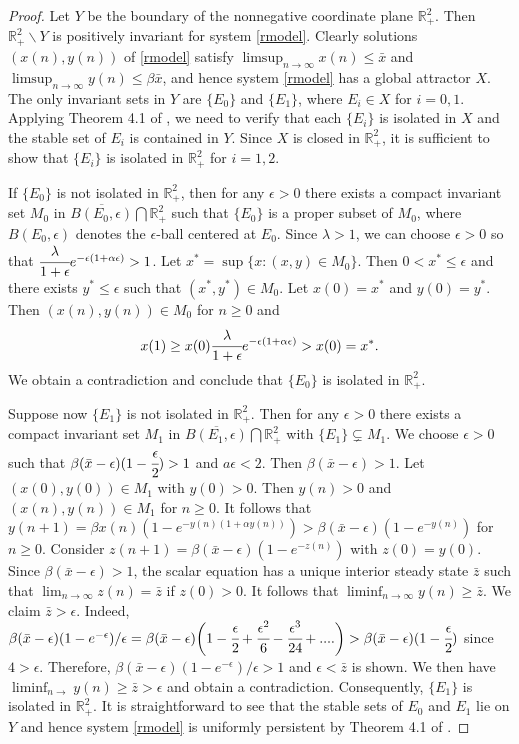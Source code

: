 \documentclass[11pt]{article}
\begin{document}
\begin{proof} Let $Y$ be the boundary of the nonnegative
coordinate plane $\mathbb{R}_+^2$. Then $\mathbb{R}_+^2\backslash
Y$ is positively invariant for system \eqref{rmodel}. Clearly
solutions $(x(n),y(n))$ of \eqref{rmodel} satisfy
$\limsup_{n\rightarrow\infty}x(n)\leq\bar x$ and
$\limsup_{n\rightarrow\infty}y(n)\leq\beta\bar x$, and hence
system \eqref{rmodel} has a global attractor $X$. The only
invariant sets in $Y$ are $\{E_0\}$ and $\{E_1\}$, where $E_i\in
X$ for $i=0,1$. Applying Theorem 4.1 of \cite{so}, we need to
verify that each $\{E_i\}$ is isolated in $X$ and the stable set
of $E_i$ is contained in $Y$. Since $X$ is closed in
$\mathbb{R}_+^2$, it is sufficient to show that $\{E_i\}$ is
isolated in $\mathbb{R}_+^2$ for $i=1, 2$.

If $\{E_0\}$ is not isolated in $\mathbb{R}_+^2$, then for any
$\epsilon>0$ there exists a compact invariant set $M_0$ in
$\overline{B(E_0,\epsilon)}\bigcap \mathbb{R}_+^2$ such that
$\{E_0\}$ is a proper subset of $M_0$, where $B(E_0, \epsilon)$
denotes the $\epsilon$-ball centered at $E_0$. Since $\lambda>1$,
we can choose $\epsilon>0$ so that
$\cfrac{\lambda}{1+\epsilon}e^{-\epsilon(1+\alpha \epsilon)}>1$.
Let $x^*=\sup\{x:(x,y)\in M_0\}$. Then $0<x^*\leq\epsilon$ and
there exists $y^*\leq\epsilon$ such that $(x^*,y^*)\in M_0$. Let
$x(0)=x^*$ and $y(0)=y^*$. Then $(x(n),y(n))\in M_0$ for $n\geq 0$
and
$$x(1)\geq
x(0)\cfrac{\lambda}{1+\epsilon}e^{-\epsilon(1+\alpha
\epsilon)}>x(0)=x^*.$$ We obtain a contradiction and conclude that
$\{E_0\}$ is isolated in $\mathbb{R}_+^2$.

Suppose now $\{E_1\}$ is not isolated in $\mathbb{R}_+^2$. Then
for any $\epsilon>0$ there exists a compact invariant set $M_1$ in
$\overline{B(E_1,\epsilon)}\bigcap\mathbb{R}_+^2$ with $\{E_1\}
\varsubsetneq M_1$. We choose $\epsilon>0$ such that $\beta(\bar
x-\epsilon)(1-\cfrac{\epsilon}{2})>1$ and $a\epsilon<2$. Then
$\beta(\bar x-\epsilon)>1$. Let $(x(0),y(0))\in M_1$ with
$y(0)>0$. Then $y(n)>0$  and $(x(n),y(n))\in M_1$ for $n\geq 0$.
It follows that $y(n+1)=\beta x(n)(1-e^{-y(n)(1+\alpha
y(n))})>\beta(\bar x-\epsilon)(1-e^{-y(n)})$ for $n\geq 0$.
Consider $z(n+1)=\beta(\bar x-\epsilon)(1-e^{-z(n)})$ with
$z(0)=y(0)$. Since $\beta(\bar x-\epsilon)>1$, the scalar equation
has a unique interior steady state $\bar z$ such that
$\lim_{n\rightarrow\infty}z(n)=\bar z$ if $z(0)>0$. It follows
that $\liminf_{n\rightarrow\infty}y(n)\geq \bar z$. We claim $\bar
z>\epsilon$. Indeed, $\beta(\bar
x-\epsilon)(1-e^{-\epsilon})/\epsilon=\beta(\bar
x-\epsilon)\bigg(1-\cfrac{\epsilon}{2}+\cfrac{\epsilon^2}{6}-\cfrac{\epsilon^3}{24}+....\bigg)>\beta(\bar
x-\epsilon)(1-\cfrac{\epsilon}{2})$ since $4>\epsilon$. Therefore,
$\beta(\bar x-\epsilon)(1-e^{-\epsilon})/\epsilon>1$ and
$\epsilon<\bar z$ is shown. We then have
$\liminf_{n\rightarrow}y(n)\geq\bar z>\epsilon$ and obtain a
contradiction. Consequently, $\{E_1\}$ is isolated in
$\mathbb{R}_+^2$.  It is straightforward to see that the stable
sets of $E_0$ and $E_1$ lie on $Y$ and hence system \eqref{rmodel}
is uniformly persistent by Theorem 4.1 of \cite{so}. \end{proof}
\end{document}
